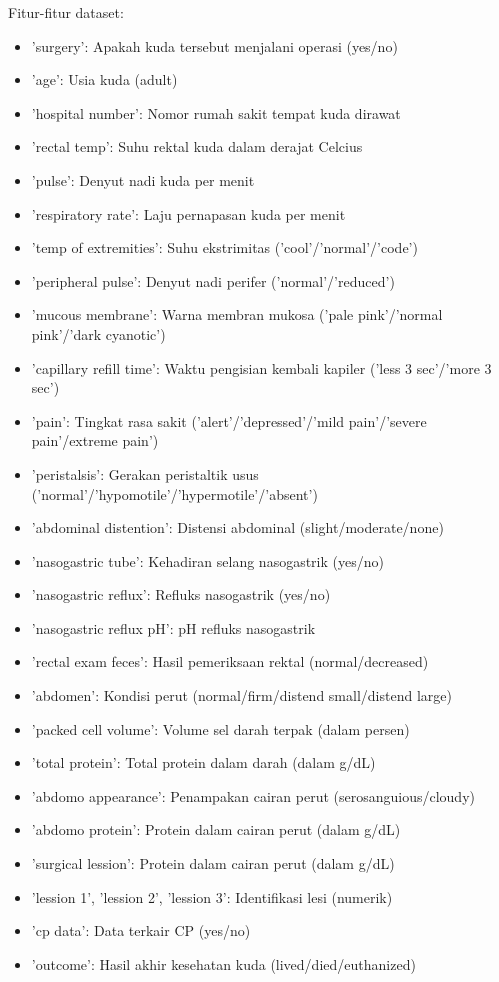 \documentclass[conference]{IEEEtran}
\begin{document}
Fitur-fitur dataset:
\begin{itemize}
    \item 'surgery': Apakah kuda tersebut menjalani operasi (yes/no)
    \item 'age': Usia kuda (adult)
    \item 'hospital number': Nomor rumah sakit tempat kuda dirawat
    \item 'rectal temp': Suhu rektal kuda dalam derajat Celcius
    \item 'pulse': Denyut nadi kuda per menit 
    \item 'respiratory rate': Laju pernapasan kuda per menit 
    \item 'temp of extremities': Suhu ekstrimitas ('cool'/'normal'/'code')
    \item 'peripheral pulse': Denyut nadi perifer ('normal'/'reduced')
    \item 'mucous membrane': Warna membran mukosa ('pale pink'/'normal pink'/'dark cyanotic')
    \item 'capillary refill time': Waktu pengisian kembali kapiler ('less 3 sec'/'more 3 sec')
    \item 'pain': Tingkat rasa sakit ('alert'/'depressed'/'mild pain'/'severe pain'/extreme pain')
    \item 'peristalsis': Gerakan peristaltik usus ('normal'/'hypomotile'/'hypermotile'/'absent')
    \item 'abdominal distention': Distensi abdominal (slight/moderate/none)
    \item 'nasogastric tube': Kehadiran selang nasogastrik (yes/no)
    \item 'nasogastric reflux': Refluks nasogastrik (yes/no)
    \item 'nasogastric reflux pH': pH refluks nasogastrik
    \item 'rectal exam feces': Hasil pemeriksaan rektal (normal/decreased)
    \item 'abdomen': Kondisi perut (normal/firm/distend small/distend large)
    \item 'packed cell volume': Volume sel darah terpak (dalam persen)
    \item 'total protein': Total protein dalam darah (dalam g/dL)
    \item 'abdomo appearance': Penampakan cairan perut (serosanguious/cloudy)
    \item 'abdomo protein': Protein dalam cairan perut (dalam g/dL)
    \item 'surgical lession': Protein dalam cairan perut (dalam g/dL)
    \item 'lession 1', 'lession 2', 'lession 3': Identifikasi lesi (numerik)
    \item 'cp data': Data terkair CP (yes/no)
    \item 'outcome': Hasil akhir kesehatan kuda (lived/died/euthanized)
\end{itemize}
\end{document}
